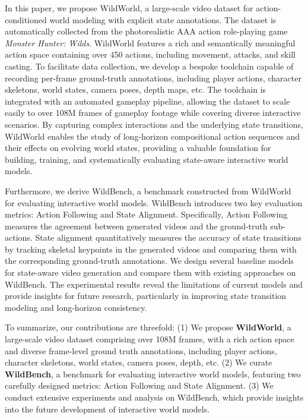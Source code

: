 In this paper, we propose WildWorld, a large-scale video dataset for action-conditioned world modeling with explicit state annotations.
The dataset is automatically collected from the photorealistic AAA action role-playing game \textit{Monster Hunter: Wilds}. WildWorld features a rich and semantically meaningful action space containing over 450 actions, including movement, attacks, and skill casting.
To facilitate data collection, we develop a bespoke toolchain capable of recording per-frame ground-truth annotations, including player actions, character skeletons, world states, camera poses, depth maps, etc.
The toolchain is integrated with an automated gameplay pipeline, allowing the dataset to scale easily to over 108M frames of gameplay footage while covering diverse interactive scenarios.
By capturing complex interactions and the underlying state transitions, WildWorld enables the study of long-horizon compositional action sequences and their effects on evolving world states, providing a valuable foundation for building, training, and systematically evaluating state-aware interactive world models.

Furthermore, we derive WildBench, a benchmark constructed from WildWorld for evaluating interactive world models. WildBench introduces two key evaluation metrics: Action Following and State Alignment.
Specifically, Action Following measures the agreement between generated videos and the ground-truth sub-actions.%
State alignment quantitatively measures the accuracy of state transitions by tracking skeletal keypoints in the generated videos and comparing them with the corresponding ground-truth annotations.
We design several baseline models for state-aware video generation and compare them with existing approaches on WildBench.
The experimental results reveal the limitations of current models and provide insights for future research, particularly in improving state transition modeling and long-horizon consistency.

To summarize, our contributions are threefold:
(1) We propose \textbf{WildWorld}, a large-scale video dataset comprising over 108M frames, with a rich action space and diverse frame-level ground truth annotations, including player actions, character skeletons, world states, camera poses, depth, etc.
(2) We curate \textbf{WildBench}, a benchmark for evaluating interactive world models, featuring two carefully designed metrics: Action Following and State Alignment.
(3) We conduct extensive experiments and analysis on WildBench, which provide insights into the future development of interactive world models.
